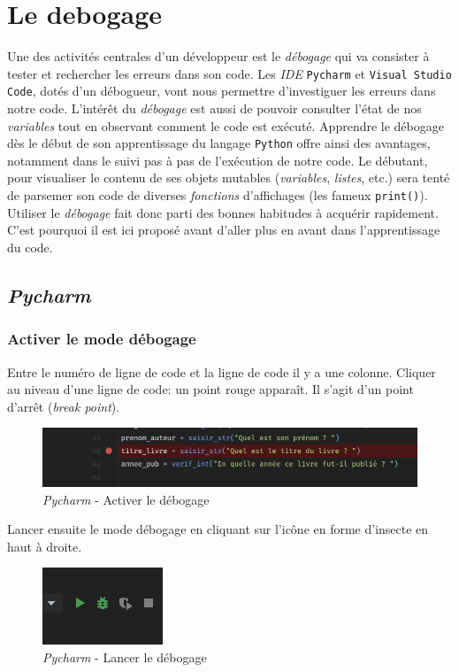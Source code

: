 \documentclass[a4paper,12pt]{book}
\begin{document}
\chapter{Le debogage}
Une des activités centrales d'un développeur est le \textit{débogage} qui va consister à tester et rechercher les erreurs dans son code. Les \textit{IDE} \texttt{Pycharm} et \texttt{Visual Studio Code}, dotés d'un débogueur, vont nous permettre d'investiguer les erreurs dans notre code. L'intérêt du \textit{débogage} est aussi de pouvoir consulter l'état de nos \textit{variables} tout en observant comment le code est exécuté. Apprendre le débogage dès le début de son apprentissage du langage \texttt{Python} offre ainsi des avantages, notamment dans le suivi pas à pas de l’exécution de notre code. Le débutant, pour visualiser le contenu de ses objets mutables (\textit{variables}, \textit{listes}, etc.) sera tenté de parsemer son code de diverses \textit{fonctions} d'affichages (les fameux \texttt{print()}). Utiliser le \textit{débogage} fait donc parti des bonnes habitudes à acquérir rapidement. C'est pourquoi il est ici proposé avant d'aller plus en avant dans l'apprentissage du code. 
\medskip

\section{\textit{Pycharm}}
\subsection*{Activer le mode débogage}
Entre le numéro de ligne de code et la ligne de code il y a une colonne. Cliquer au niveau d'une ligne de code: un point rouge apparaît. Il s'agit d'un point d'arrêt (\textit{break point}).
\begin{figure}[h]
\begin{center}
\includegraphics[scale=0.3]{IMG/Pycharm-05.png}
\caption{\textit{Pycharm} - Activer le débogage}
\end{center}
\end{figure}
\medskip

Lancer ensuite le mode débogage en cliquant sur l'icône en forme d'insecte en haut à droite.
\begin{figure}[h]
\begin{center}
\includegraphics[scale=0.6]{IMG/Pycharm-06.png}
\caption{\textit{Pycharm} - Lancer le débogage}
\end{center}
\end{figure}
\medskip
\end{document}
